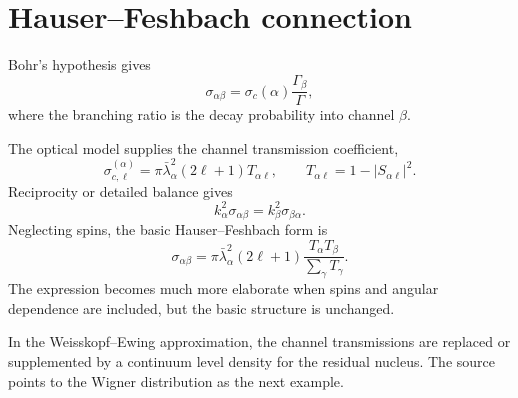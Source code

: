 \section{Hauser--Feshbach connection}
Bohr's hypothesis gives
\[
  \sigma_{\alpha\beta}
  =\sigma_c(\alpha)\frac{\Gamma_\beta}{\Gamma},
\]
where the branching ratio is the decay probability into channel $\beta$.

The optical model supplies the channel transmission coefficient,
\[
  \sigma_{c,\ell}^{(\alpha)}
  =\pi\bar\lambda_\alpha^2(2\ell+1)T_{\alpha\ell},
  \qquad
  T_{\alpha\ell}=1-|S_{\alpha\ell}|^2.
\]
Reciprocity or detailed balance gives
\[
  k_\alpha^2\sigma_{\alpha\beta}
  =k_\beta^2\sigma_{\beta\alpha}.
\]
Neglecting spins, the basic Hauser--Feshbach form is
\begin{equation}
  \sigma_{\alpha\beta}
  =\pi\bar\lambda_\alpha^2(2\ell+1)
  \frac{T_\alpha T_\beta}{\sum_\gamma T_\gamma}.
  \label{eq:om-hauser-feshbach}
\end{equation}
The expression becomes much more elaborate when spins and angular dependence are included, but the basic structure is unchanged.

In the Weisskopf--Ewing approximation, the channel transmissions are replaced or supplemented by a continuum level density for the residual nucleus.  The source points to the Wigner distribution as the next example.

